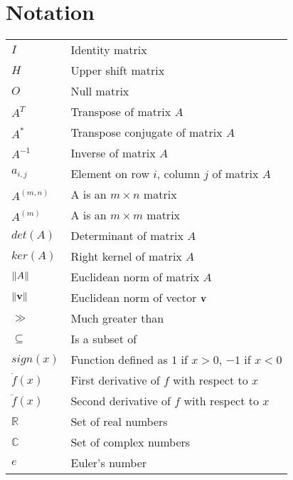 \section*{Notation}

\begin{table}[h!]
    \begin{tabularx}{\textwidth}{@{}p{}X@{}}
        \toprule
        $I$ & Identity matrix \\
        $H$ & Upper shift matrix \\
        $O$ & Null matrix \\
        $A^T$ & Transpose of matrix $A$ \\
        $A^*$ & Transpose conjugate of matrix $A$ \\
        $A^{-1}$ & Inverse of matrix $A$ \\
        $a_{i, j}$ & Element on row $i$, column $j$ of matrix $A$\\
        $A^{(m, n)}$ & A is an \(m \times n\) matrix \\
        $A^{(m)}$ & A is an \(m \times m\) matrix \\
        $det(A)$ & Determinant of matrix $A$ \\
        $ker(A)$ & Right kernel of matrix $A$ \\
        $\norm{A}$ & Euclidean norm of matrix $A$ \\
        $\norm{\vb{v}}$ & Euclidean norm of vector $\vb{v}$ \\
        $\gg$ & Much greater than \\
        $\subseteq$ & Is a subset of \\
        $sign(x)$ & Function defined as $1$ if $x > 0$, $-1$ if $x < 0$ \\
        $\dot{f}(x)$ & First derivative of $f$ with respect to $x$ \\
        $\ddot{f}(x)$ & Second derivative of $f$ with respect to $x$\\
        $\mathbb{R}$ & Set of real numbers \\
        $\mathbb{C}$ & Set of complex numbers \\
        $e$ & Euler's number \\
        \bottomrule
    \end{tabularx}
\end{table}